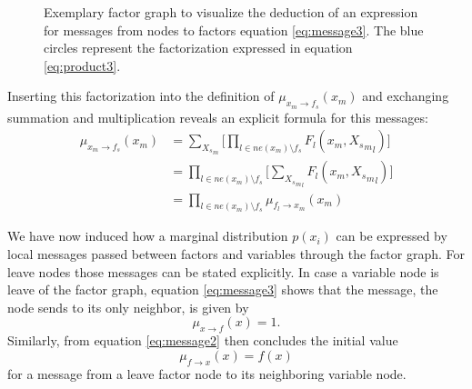 \documentclass{sigkdd}
\begin{document}
\begin{figure}[h]
	\centering
	\caption{Exemplary factor graph to visualize the deduction of an expression for messages from nodes to factors equation \ref{eq:message3}. The blue circles represent the factorization expressed in equation  \ref{eq:product3}.}\label{fig:message3}
\end{figure}

Inserting this factorization into the definition of $\mu_{x_m \rightarrow f_s}(x_m)$ and exchanging summation and multiplication reveals an explicit formula for this messages:
\begin{equation}\label{eq:message3}
    \begin{split}
        \mu_{x_m \rightarrow f_s}(x_m) &=\sum_{{X_s}_m} \Big[ \prod_{l \in ne(x_m) \setminus f_s} F_l(x_m, {{X_s}_m}_l) \Big] \\ &= \prod_{l \in ne(x_m) \setminus f_s} \Big[\sum_{{{X_s}_m}_l} F_l(x_m, {{X_s}_m}_l) \Big] \\ &= \prod_{l \in ne(x_m) \setminus f_s} \mu_{f_l \rightarrow x_m}(x_m)
    \end{split}
\end{equation}

We have now induced how a marginal distribution $p(x_i)$ can be expressed by local messages passed between factors and variables through the factor graph. For leave nodes those messages can be stated explicitly.
In case a variable node is leave of the factor graph, equation \ref{eq:message3} shows that the message, the node sends to its only neighbor, is given by
\begin{equation}\label{eq:marg_init_1}
\mu_{x \rightarrow f}(x) = 1.
\end{equation}
Similarly, from equation \ref{eq:message2} then concludes the initial value
\begin{equation}\label{eq:marg_init_2}
\mu_{f \rightarrow x}(x) = f(x)
\end{equation}
for a message from a leave factor node to its neighboring variable node.
\end{document}
